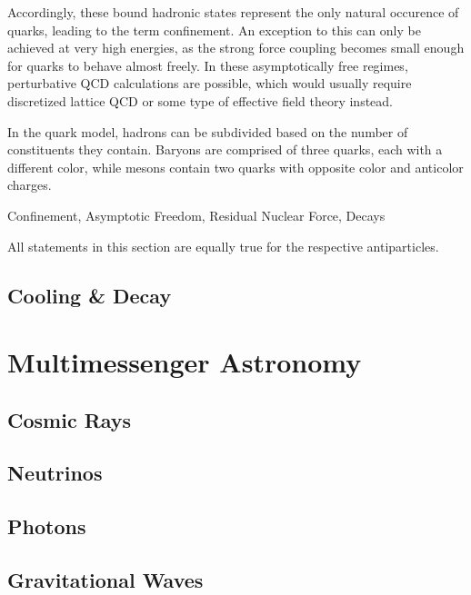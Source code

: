 Accordingly, these bound hadronic states represent the only natural occurence of quarks, leading to the term confinement. An
exception to this can only be achieved at very high energies, as the strong force coupling becomes small enough for quarks to
behave almost freely. In these asymptotically free regimes, perturbative QCD calculations are possible, which would usually
require discretized lattice QCD or some type of effective field theory instead.

In the quark model, hadrons can be subdivided based on the number of constituents they contain. Baryons are comprised of three
quarks, each with a different color, while mesons contain two quarks with opposite color and anticolor charges.





Confinement, Asymptotic Freedom, Residual Nuclear Force, Decays

All statements in this section are equally true for the respective antiparticles.



\subsection{Cooling \& Decay}
\label{sub:cooling}



\section{Multimessenger Astronomy}
\label{sec:multimessenger}



\subsection{Cosmic Rays}
\label{sub:rays}



\subsection{Neutrinos}
\label{sub:neutrinos}



\subsection{Photons}
\label{sub:photons}



\subsection{Gravitational Waves}
\label{sub:gravitational}



